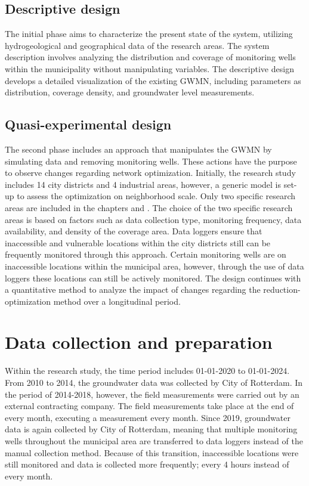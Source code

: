 \subsection{Descriptive design}
The initial phase aims to characterize the present state of the system, utilizing hydrogeological and geographical data of the research areas. The system description involves analyzing the distribution and coverage of monitoring wells within the municipality without manipulating variables. The descriptive design develops a detailed visualization of the existing GWMN, including parameters as distribution, coverage density, and groundwater level measurements.

\subsection{Quasi-experimental design}
The second phase includes an approach that manipulates the GWMN by simulating data and removing monitoring wells. These actions have the purpose to observe changes regarding network optimization. Initially, the research study includes 14 city districts and 4 industrial areas, however, a generic model is set-up to assess the optimization on neighborhood scale. Only two specific research areas are included in the chapters   and . The choice of the two specific research areas is based on factors such as data collection type, monitoring frequency, data availability, and density of the coverage area. Data loggers ensure that inaccessible and vulnerable locations within the city districts still can be frequently monitored through this approach. Certain monitoring wells are on inaccessible locations within the municipal area, however, through the use of data loggers these locations can still be actively monitored. The design continues with a quantitative method to analyze the impact of changes regarding the reduction-optimization method over a longitudinal period.

\section{Data collection and preparation}
Within the research study, the time period includes 01-01-2020 to 01-01-2024. From 2010 to 2014, the groundwater data was collected by City of Rotterdam. In the period of 2014-2018, however, the field measurements were carried out by an external contracting company. The field measurements take place at the end of every month, executing a measurement every month. Since 2019, groundwater data is again collected by City of Rotterdam, meaning that multiple monitoring wells throughout the municipal area are transferred to data loggers instead of the manual collection method. Because of this transition, inaccessible locations were still monitored and data is collected more frequently; every 4 hours instead of every month.

